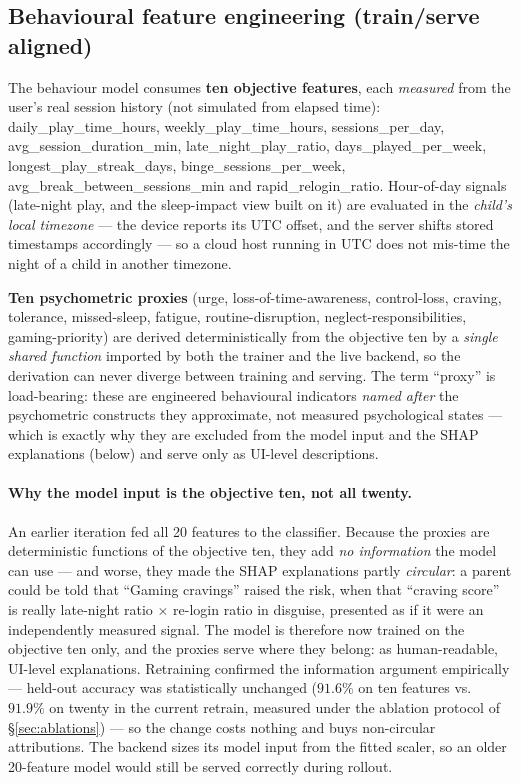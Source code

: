 \documentclass[11pt,a4paper]{article}
\begin{document}
\subsection{Behavioural feature engineering (train/serve aligned)}
\label{sec:features}
The behaviour model consumes \textbf{ten objective features}, each \emph{measured}
from the user's real session history (not simulated from elapsed
time): daily\_play\_time\_hours, weekly\_play\_time\_hours, sessions\_per\_day,
avg\_session\_duration\_min, late\_night\_play\_ratio, days\_played\_per\_week,
longest\_play\_streak\_days, binge\_sessions\_per\_week,
avg\_break\_between\_sessions\_min and rapid\_relogin\_ratio. Hour-of-day signals
(late-night play, and the sleep-impact view built on it) are evaluated in the
\emph{child's local timezone} --- the device reports its UTC offset, and the server
shifts stored timestamps accordingly --- so a cloud host running in UTC does not
mis-time the night of a child in another timezone.

\textbf{Ten psychometric proxies} (urge, loss-of-time-awareness, control-loss,
craving, tolerance, missed-sleep, fatigue, routine-disruption,
neglect-responsibilities, gaming-priority) are derived deterministically from the
objective ten by a \emph{single shared function} imported by both the trainer and the
live backend, so the derivation can never diverge between training and serving. The
term ``proxy'' is load-bearing: these are engineered behavioural indicators
\emph{named after} the psychometric constructs they approximate, not measured
psychological states --- which is exactly why they are excluded from the model input
and the SHAP explanations (below) and serve only as UI-level descriptions.

\paragraph{Why the model input is the objective ten, not all twenty.}
An earlier iteration fed all 20 features to the classifier. Because the proxies are
deterministic functions of the objective ten, they add \emph{no information} the model
can use --- and worse, they made the SHAP explanations partly \emph{circular}: a parent
could be told that ``Gaming cravings'' raised the risk, when that ``craving score'' is
really late-night ratio $\times$ re-login ratio in disguise, presented as if it were an
independently measured signal. The model is therefore now trained on the objective ten
only, and the proxies serve where they belong: as human-readable, UI-level explanations.
Retraining confirmed the information argument empirically --- held-out accuracy was
statistically unchanged ($91.6\%$ on ten features vs.\ $91.9\%$ on twenty in the
current retrain, measured under the ablation protocol of \S\ref{sec:ablations}) --- so the
change costs nothing and buys non-circular attributions. The backend sizes its model input
from the fitted scaler, so an older 20-feature model would still be served correctly
during rollout.
\end{document}
